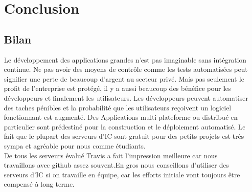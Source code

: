 \chapter{Conclusion}
\label{chap:conclusion}

\section{Bilan}
Le développement des applications grandes n'est pas imaginable sans intégration continue. Ne pas avoir des moyens de contrôle comme les tests automatisées peut signifier une perte de beaucoup d'argent au secteur privé. Mais pas seulement le profit de l'entreprise est protégé, il y a aussi beaucoup des bénéfice pour les développeurs et finalement les utilisateurs. Les développeurs peuvent automatiser des taches pénibles et la probabilité que les utilisateurs reçoivent un logiciel fonctionnant est augmenté.
Des Applications multi-plateforme ou distribué en particulier sont prédestiné pour la construction et le déploiement automatisé. Le fait que le plupart des serveurs d'IC sont gratuit pour des petits projets est très sympa et agréable pour nous comme étudiants.\\
De tous les serveurs évalué Travis a fait l'impression meilleure car nous travaillons avec github assez souvent.En gros nous conseillons d'utiliser des serveurs d'IC si on travaille en équipe, car les efforts initiale vont toujours être compensé à long terme.